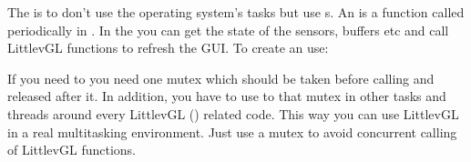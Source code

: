 \documentclass[letterpaper,10pt,english]{sphinxmanual}
\begin{document}
The  is to don’t use the operating system’s tasks but use s. An  is a function called periodically in .
In the  you can get the state of the sensors, buffers etc and call LittlevGL functions to refresh the GUI.
To create an  use: 

If you need to  you need one mutex which should be taken before calling  and released after it.
In addition, you have to use to that mutex in other tasks and threads around every LittlevGL () related code.
This way you can use LittlevGL in a real multitasking environment. Just use a mutex to avoid concurrent calling of LittlevGL functions.



\renewcommand{\indexname}{Index}
\printindex
\end{document}
